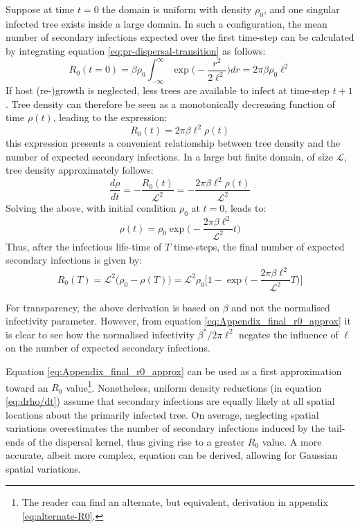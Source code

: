 Suppose at time $t=0$ the domain is uniform with density $\rho_0$, and one singular infected tree exists inside a large domain.
In such a configuration, the mean number of secondary infections expected over the first time-step can be calculated by integrating equation \ref{eq:pr-dispersal-transition} as follows:
\begin{equation}
    R_0(t = 0) = \beta \rho_0 \int^{\infty}_{-\infty} \exp\Big(-\frac{r^2}{2\ell^2}\Big)dr= 2\pi\beta\rho_0\ell^2
\end{equation}
If host (re-)growth is neglected, less trees are available to infect at time-step $t+1$. 
Tree density can therefore be seen as a monotonically decreasing function of time $\rho(t)$, leading to the expression:
\begin{equation}
    R_0(t) = 2\pi\beta\ell^2\rho(t)
    \label{eq:r0-A}
\end{equation}
this expression presents a convenient relationship between tree density and the number of expected secondary infections. 
In a large but finite domain, of size $\mathcal{L}$, tree density approximately follows:
\begin{equation}
\label{eq:drho/dt}
    \frac{d\rho}{dt} = - \frac{R_0(t)}{\mathcal{L}^2} = -\frac{2\pi\beta\ell^2\rho(t)}{\mathcal{L}^2}
\end{equation}
Solving the above, with initial condition $\rho_0$ at $t=0$, leads to:
\begin{equation}
\label{eq:rho(t)-linear}
    \rho(t) = \rho_0 \exp\Big(-\frac{2\pi\beta\ell^2}{\mathcal{L}^2} t \Big)
\end{equation}
Thus, after the infectious life-time of $T$ time-steps, the final number of expected secondary infections is given by:
\begin{equation}
\label{eq:Appendix_final_r0_approx}
    R_0(T) =  \mathcal{L}^2\big(\rho_0 - \rho(T)\big) = \mathcal{L}^2\rho_0\Big[1 - \exp\big(-\frac{2\pi\beta\ell^2}{\mathcal{L}^2} T \big) \Big]
\end{equation}

For transparency, the above derivation is based on $\beta$ and not the normalised infectivity parameter. 
However, from equation \ref{eq:Appendix_final_r0_approx} it is clear to see how the normalised infectivity $\beta^*/2\pi\ell^2$ negates the influence of $\ell$ on the number of expected secondary infections.

Equation \ref{eq:Appendix_final_r0_approx} can be used as a first approximation toward an $R_0$ value\footnote{The reader can find an alternate, but equivalent, derivation in appendix \ref{eq:alternate-R0}.}.
Nonetheless, uniform density reductions (in equation \ref{eq:drho/dt}) assume that secondary infections are equally likely at all spatial locations about the primarily infected tree. 
On average, neglecting spatial variations overestimates the number of secondary infections induced by the tail-ends of the dispersal kernel,
thus giving rise to a greater $R_0$ value.
A more accurate, albeit more complex, equation can be derived, allowing for Gaussian spatial variations.

